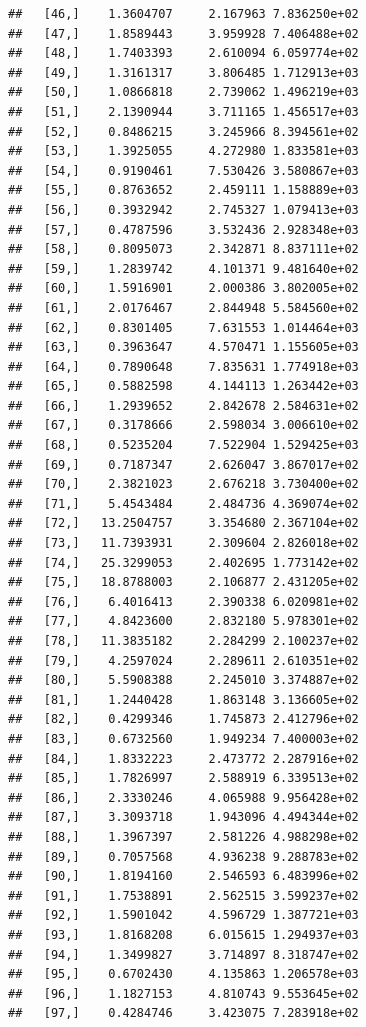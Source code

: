 \documentclass[article]{jss}\usepackage[]{graphicx}\usepackage[]{xcolor}
\makeatletter
\newenvironment{kframe}{%
 \def\at@end@of@kframe{}%
 \ifinner\ifhmode%
  \def\at@end@of@kframe{\end{minipage}}%
  \begin{minipage}{\columnwidth}%
 \fi\fi%
 \def\FrameCommand##1{\hskip\@totalleftmargin \hskip-\fboxsep
 \colorbox{shadecolor}{##1}\hskip-\fboxsep
     \hskip-\linewidth \hskip-\@totalleftmargin \hskip\columnwidth}%
 \MakeFramed {\advance\hsize-\width
   \@totalleftmargin\z@ \linewidth\hsize
   \@setminipage}}%
 {\par\unskip\endMakeFramed%
 \at@end@of@kframe}
\newenvironment{knitrout}{}{} %
\makeatother
\begin{document}
\begin{knitrout}
\begin{kframe}
\begin{verbatim}
##   [46,]    1.3604707     2.167963 7.836250e+02
##   [47,]    1.8589443     3.959928 7.406488e+02
##   [48,]    1.7403393     2.610094 6.059774e+02
##   [49,]    1.3161317     3.806485 1.712913e+03
##   [50,]    1.0866818     2.739062 1.496219e+03
##   [51,]    2.1390944     3.711165 1.456517e+03
##   [52,]    0.8486215     3.245966 8.394561e+02
##   [53,]    1.3925055     4.272980 1.833581e+03
##   [54,]    0.9190461     7.530426 3.580867e+03
##   [55,]    0.8763652     2.459111 1.158889e+03
##   [56,]    0.3932942     2.745327 1.079413e+03
##   [57,]    0.4787596     3.532436 2.928348e+03
##   [58,]    0.8095073     2.342871 8.837111e+02
##   [59,]    1.2839742     4.101371 9.481640e+02
##   [60,]    1.5916901     2.000386 3.802005e+02
##   [61,]    2.0176467     2.844948 5.584560e+02
##   [62,]    0.8301405     7.631553 1.014464e+03
##   [63,]    0.3963647     4.570471 1.155605e+03
##   [64,]    0.7890648     7.835631 1.774918e+03
##   [65,]    0.5882598     4.144113 1.263442e+03
##   [66,]    1.2939652     2.842678 2.584631e+02
##   [67,]    0.3178666     2.598034 3.006610e+02
##   [68,]    0.5235204     7.522904 1.529425e+03
##   [69,]    0.7187347     2.626047 3.867017e+02
##   [70,]    2.3821023     2.676218 3.730400e+02
##   [71,]    5.4543484     2.484736 4.369074e+02
##   [72,]   13.2504757     3.354680 2.367104e+02
##   [73,]   11.7393931     2.309604 2.826018e+02
##   [74,]   25.3299053     2.402695 1.773142e+02
##   [75,]   18.8788003     2.106877 2.431205e+02
##   [76,]    6.4016413     2.390338 6.020981e+02
##   [77,]    4.8423600     2.832180 5.978301e+02
##   [78,]   11.3835182     2.284299 2.100237e+02
##   [79,]    4.2597024     2.289611 2.610351e+02
##   [80,]    5.5908388     2.245010 3.374887e+02
##   [81,]    1.2440428     1.863148 3.136605e+02
##   [82,]    0.4299346     1.745873 2.412796e+02
##   [83,]    0.6732560     1.949234 7.400003e+02
##   [84,]    1.8332223     2.473772 2.287916e+02
##   [85,]    1.7826997     2.588919 6.339513e+02
##   [86,]    2.3330246     4.065988 9.956428e+02
##   [87,]    3.3093718     1.943096 4.494344e+02
##   [88,]    1.3967397     2.581226 4.988298e+02
##   [89,]    0.7057568     4.936238 9.288783e+02
##   [90,]    1.8194160     2.546593 6.483996e+02
##   [91,]    1.7538891     2.562515 3.599237e+02
##   [92,]    1.5901042     4.596729 1.387721e+03
##   [93,]    1.8168208     6.015615 1.294937e+03
##   [94,]    1.3499827     3.714897 8.318747e+02
##   [95,]    0.6702430     4.135863 1.206578e+03
##   [96,]    1.1827153     4.810743 9.553645e+02
##   [97,]    0.4284746     3.423075 7.283918e+02

\end{verbatim}
\end{kframe}
\end{knitrout}
\end{document}
